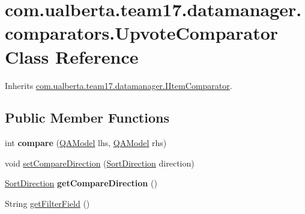 \hypertarget{classcom_1_1ualberta_1_1team17_1_1datamanager_1_1comparators_1_1_upvote_comparator}{\section{com.\+ualberta.\+team17.\+datamanager.\+comparators.\+Upvote\+Comparator Class Reference}
\label{classcom_1_1ualberta_1_1team17_1_1datamanager_1_1comparators_1_1_upvote_comparator}
}


Inherits \hyperlink{interfacecom_1_1ualberta_1_1team17_1_1datamanager_1_1_i_item_comparator}{com.\+ualberta.\+team17.\+datamanager.\+I\+Item\+Comparator}.

\subsection*{Public Member Functions}
\begin{DoxyCompactItemize}
\item 
\hypertarget{classcom_1_1ualberta_1_1team17_1_1datamanager_1_1comparators_1_1_upvote_comparator_a3be1e0114f801f20256ad3a2ce259755}{int {\bfseries compare} (\hyperlink{classcom_1_1ualberta_1_1team17_1_1_q_a_model}{Q\+A\+Model} lhs, \hyperlink{classcom_1_1ualberta_1_1team17_1_1_q_a_model}{Q\+A\+Model} rhs)}\label{classcom_1_1ualberta_1_1team17_1_1datamanager_1_1comparators_1_1_upvote_comparator_a3be1e0114f801f20256ad3a2ce259755}

\item 
void \hyperlink{classcom_1_1ualberta_1_1team17_1_1datamanager_1_1comparators_1_1_upvote_comparator_a1ca9dfc9b43463beb1c3115b3f9a462c}{set\+Compare\+Direction} (\hyperlink{enumcom_1_1ualberta_1_1team17_1_1datamanager_1_1_i_item_comparator_1_1_sort_direction}{Sort\+Direction} direction)
\item 
\hypertarget{classcom_1_1ualberta_1_1team17_1_1datamanager_1_1comparators_1_1_upvote_comparator_a28a52d5a87f8c9b60334846e14c74de0}{\hyperlink{enumcom_1_1ualberta_1_1team17_1_1datamanager_1_1_i_item_comparator_1_1_sort_direction}{Sort\+Direction} {\bfseries get\+Compare\+Direction} ()}\label{classcom_1_1ualberta_1_1team17_1_1datamanager_1_1comparators_1_1_upvote_comparator_a28a52d5a87f8c9b60334846e14c74de0}

\item 
String \hyperlink{classcom_1_1ualberta_1_1team17_1_1datamanager_1_1comparators_1_1_upvote_comparator_a1e898949ac2d3480c575417ca4792b83}{get\+Filter\+Field} ()
\end{DoxyCompactItemize}


